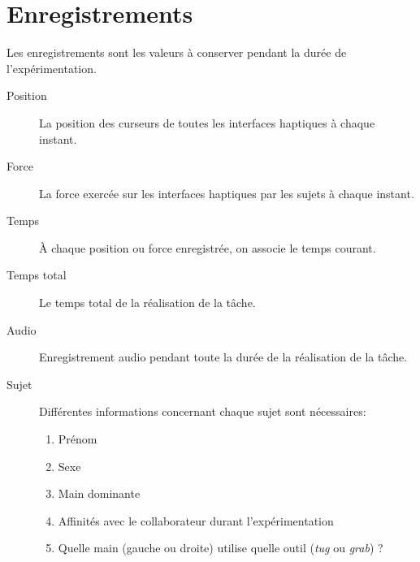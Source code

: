\documentclass[a4paper,fleqn]{report}
\begin{document}
		\section{Enregistrements}
			Les enregistrements sont les valeurs à conserver pendant la durée de l'expérimentation.
			\begin{description}
				\item[Position] La position des curseurs de toutes les interfaces haptiques à chaque instant.
				\item[Force] La force exercée sur les interfaces haptiques par les sujets à chaque instant.
				\item[Temps] À chaque position ou force enregistrée, on associe le temps courant.
				\item[Temps total] Le temps total de la réalisation de la tâche.
				\item[Audio] Enregistrement audio pendant toute la durée de la réalisation de la tâche.
				\item[Sujet] Différentes informations concernant chaque sujet sont nécessaires:
				\begin{enumerate}
					\item Prénom 
					\item Sexe
					\item Main dominante
					\item Affinités avec le collaborateur durant l'expérimentation
					\item Quelle main (gauche ou droite) utilise quelle outil (\emph{tug} ou \emph{grab}) ?
				\end{enumerate}
			\end{description}
\end{document}

